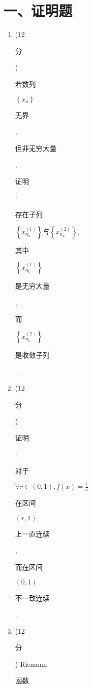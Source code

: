 \documentclass[10pt]{article}
\begin{document}
\section{一、证明题}
\begin{enumerate}
  \item (12 \begin{CJK}{UTF8}{mj}分\end{CJK}) \begin{CJK}{UTF8}{mj}若数列\end{CJK} $\left\{x_{n}\right\}$ \begin{CJK}{UTF8}{mj}无界\end{CJK}, \begin{CJK}{UTF8}{mj}但非无穷大量\end{CJK}, \begin{CJK}{UTF8}{mj}证明\end{CJK}: \begin{CJK}{UTF8}{mj}存在子列\end{CJK} $\left\{x_{n_{k}}^{(1)}\right\} 与\left\{x_{n_{k}}^{(2)}\right\}$, \begin{CJK}{UTF8}{mj}其中\end{CJK} $\left\{x_{n_{k}}^{(1)}\right\}$ \begin{CJK}{UTF8}{mj}是无穷大量\end{CJK}, \begin{CJK}{UTF8}{mj}而\end{CJK} $\left\{x_{n_{k}}^{(2)}\right\}$ \begin{CJK}{UTF8}{mj}是收敛子列\end{CJK}.

  \item (12 \begin{CJK}{UTF8}{mj}分\end{CJK}) \begin{CJK}{UTF8}{mj}证明\end{CJK}: \begin{CJK}{UTF8}{mj}对于\end{CJK} $\forall r \in(0,1), f(x)=\frac{1}{x}$ \begin{CJK}{UTF8}{mj}在区间\end{CJK} $(r, 1)$ \begin{CJK}{UTF8}{mj}上一直连续\end{CJK}, \begin{CJK}{UTF8}{mj}而在区间\end{CJK} $(0,1)$ \begin{CJK}{UTF8}{mj}不一致连续\end{CJK}.

  \item (12 \begin{CJK}{UTF8}{mj}分\end{CJK}) Riemann \begin{CJK}{UTF8}{mj}函数\end{CJK}

\end{enumerate}
\end{document}

